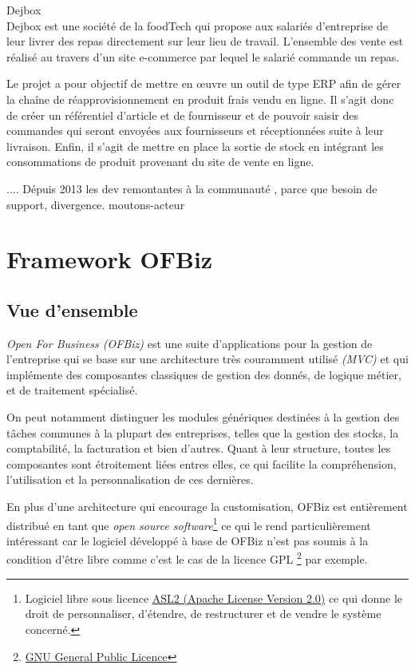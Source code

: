 Dejbox
\\
Dejbox est une société de la foodTech qui propose aux salariés d’entreprise de leur livrer des repas directement sur leur lieu de travail. L’ensemble des vente est réalisé au travers d’un site e-commerce par lequel le salarié commande un repas.

Le projet a pour objectif de mettre en œuvre un outil de type ERP afin de gérer la chaîne de réapprovisionnement en produit frais vendu en ligne. Il s’agit donc de créer un référentiel d’article et de fournisseur et de pouvoir saisir des commandes qui seront envoyées aux fournisseurs et réceptionnées suite à leur livraison. Enfin, il s’agit de mettre en place la sortie de stock en intégrant les consommations de produit provenant du site de vente en ligne.


....
Dépuis 2013 les dev remontantes à la communauté , parce que besoin de support,  divergence. moutons-acteur 






\newpage
\section{Framework OFBiz}
\subsection{Vue d'ensemble }
\emph{Open For Business (OFBiz)} est une suite d'applications pour la gestion de l'entreprise qui se base sur une architecture très couramment utilisé \emph{(MVC)} et qui implémente des composantes classiques de gestion des donnés, de logique métier, et de traitement spécialisé. 

On peut notamment distinguer les modules génériques destinées à la gestion des tâches communes à la plupart des entreprises, telles que la gestion des stocks, la comptabilité, la facturation et bien d'autres. Quant à leur structure, toutes les composantes sont étroitement liées entres elles, ce qui facilite la compréhension, l'utilisation et la personnalisation de ces dernières. 


En plus d'une architecture qui encourage la customisation, OFBiz est entièrement distribué en tant que \emph{open source software}\footnote{Logiciel libre sous licence \href{https://www.apache.org/licenses/LICENSE-2.0.html}{ASL2 (Apache License Version 2.0)} ce qui donne le droit de personnaliser, d'étendre, de restructurer et de vendre le système concerné. } ce qui le rend particulièrement intéressant car le logiciel développé à base de OFBiz n'est pas soumis à la condition d'être libre comme c'est le cas de la licence GPL  \footnote{\href{http://www.gnu.org/licenses/gpl-3.0.html}{GNU General Public Licence}} par exemple.

